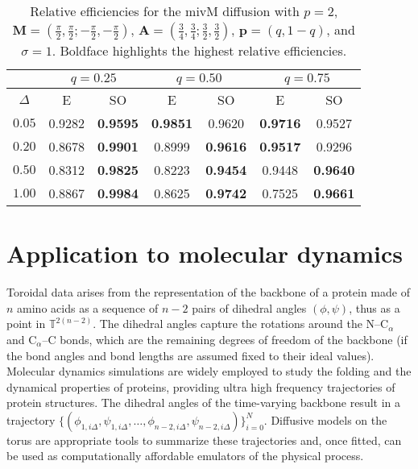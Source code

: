 \documentclass[oneside,11pt]{article}
\newcommand{\T}{\mathbb{T}}
\newcommand{\bp}{\mathbf{p}}
\newcommand{\bA}{\mathbf{A}}
\newcommand{\bM}{\mathbf{M}}
\newcommand{\lrp}[1]{\left(#1\right)}
\begin{document}
\begin{table}[H]
\centering
\small
\begin{tabular}{c|cc||cc||cc}
\toprule\toprule
& \multicolumn{2}{c||}{$q=0.25$} & \multicolumn{2}{c||}{$q=0.50$} & \multicolumn{2}{c}{$q=0.75$} \\ \midrule
$\Delta$ &      E      &        SO        &      E      &        SO        &      E      &       SO       \\ \midrule
$0.05$ &  0.9282 & \bf  0.9595 & \bf  0.9851 &  0.9620 & \bf  0.9716 &  0.9527\\
$0.20$ &  0.8678 & \bf  0.9901 &  0.8999 & \bf  0.9616 & \bf  0.9517 &  0.9296\\
$0.50$ &  0.8312 & \bf  0.9825 &  0.8223 & \bf  0.9454 &  0.9448 & \bf  0.9640\\
$1.00$ &  0.8867 & \bf  0.9984 &  0.8625 & \bf  0.9742 &  0.7525 & \bf  0.9661\\ \bottomrule\bottomrule
\end{tabular}
\caption{\small Relative efficiencies for the mivM diffusion with $p=2$, $\bM=\lrp{\tfrac{\pi}{2},\tfrac{\pi}{2};-\tfrac{\pi}{2},-\tfrac{\pi}{2}}$,  $\bA=\lrp{\tfrac{3}{4},\tfrac{3}{4};\tfrac{3}{2},\tfrac{3}{2}}$, $\bp=(q,1-q)$, and $\sigma=1$. Boldface highlights the highest relative efficiencies.\label{tab:mivm}}
\end{table}

\section{Application to molecular dynamics}
\label{sec:app}

Toroidal data arises from the representation of the backbone of a protein made of $n$ amino acids as a sequence of $n-2$ pairs of dihedral angles $(\phi,\psi)$, thus as a point in $\T^{2(n-2)}$. The dihedral angles capture the rotations around the N--C$_{\alpha}$ and C$_{\alpha}$--C bonds, which are the remaining degrees of freedom of the backbone (if the bond angles and bond lengths are assumed fixed to their ideal values). Molecular dynamics simulations are widely
employed to study the folding and the dynamical properties of proteins,
providing ultra high frequency trajectories of protein structures.
The dihedral angles of the time-varying backbone
result in a trajectory $\{(\phi_{1,i\Delta},\allowbreak\psi_{1,i\Delta},\allowbreak\ldots,\phi_{n-2,i\Delta},\psi_{n-2,i\Delta})\}_{i=0}^{N}$. Diffusive models on the torus are appropriate tools to summarize these trajectories and, once fitted, can be used as computationally affordable emulators of the physical process.\\
\end{document}
